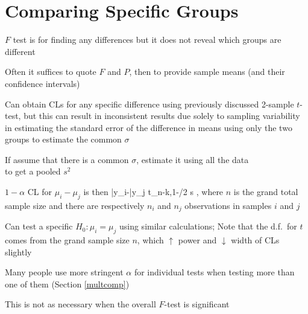\section{Comparing Specific Groups} 
\bi
\item $F$ test is for finding any differences but it does not reveal
  which groups are different
\item Often it suffices to quote $F$ and $P$, then to provide sample
  means (and their confidence intervals)
\item Can obtain CLs for any specific difference using previously
  discussed 2-sample $t$-test, but this can result in inconsistent
  results due solely to sampling variability in estimating the
  standard error of the difference in means using only the two groups
  to estimate the common $\sigma$
\item If assume that there is a common $\sigma$, estimate it using all
  the data 
  \\ to get a pooled $s^2$
\item $1-\alpha$ CL for $\mu_{i}-\mu_{j}$ is then
\beq
\bar{y}_{i}-\bar{y}_{j} \pm t_{n-k,1-\alpha/2} \times s
,
\eeq
where $n$ is the grand total sample size and there are respectively
$n_{i}$ and $n_{j}$ observations in samples $i$ and $j$
\item Can test a specific $H_{0}: \mu_{i}=\mu_{j}$ using similar
  calculations; Note that the d.f.\ for $t$ comes from the grand
  sample size $n$, which $\uparrow$ power and $\downarrow$ width of
  CLs slightly
\item Many people use more stringent $\alpha$ for individual tests
  when testing more than one of them (Section \ref{multcomp})
 \bi
 \item This is not as necessary when the overall $F$-test is
   significant
 \ei
\ei

